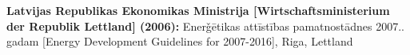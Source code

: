 \documentclass[
11pt,			%
paper=a4,		%
ngerman,		%
BCOR=0pt,		%
DIV=calc,		%
headinclude,	%
headsepline,	%
numbers=noenddot,
]{scrreprt}
\begin{document}
\textbf{Latvijas Republikas Ekonomikas Ministrija [Wirtschaftsministerium der Republik Lettland] (2006):} Ener\v{g}\={e}tikas attīst\={i}bas pamatnost\={a}dnes 2007.. gadam [Energy Development Guidelines for 2007-2016], Riga, Lettland 
\end{document}
